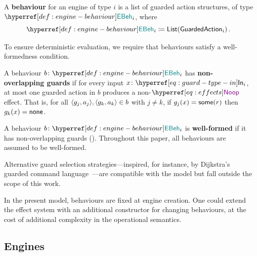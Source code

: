 \documentclass[
  a4paper,        %
  techreport,     %
]{art}
\begin{document}
\begin{definition}\label{def:engine-behaviour}%
A \textbf{behaviour} for an engine of type $i$ is a list of guarded action
structures, of type $\behaviourtype{i}$, where
\begin{equation}
\defequal{
  \behaviourtype{i}
}{
  \List{
    \mathsf{GuardedAction}_i
  }
}\,.
\end{equation}
\end{definition}

To ensure deterministic evaluation, we require that behaviours satisfy a
well-formedness condition.

\begin{definition}\label{def:non-overlapping-guards}%
A behaviour $\typing{b}{\behaviourtype{i}}$ has \textbf{non-overlapping guards}
if for every input $\typing{x}{\In{i}}$, at most one guarded action in $b$
produces a non-$\noop$ effect. That is, for all
$ \langle g_j , a_j \rangle ,  \langle g_k , a_k \rangle  \in b$ with $j \neq k$,
if $g_j(x) = \mathsf{some}(r)$ then $g_k(x) = \mathsf{none}$.
\end{definition}

\begin{definition}\label{def:well-formed-behaviour}%
A behaviour $\typing{b}{\behaviourtype{i}}$ is \textbf{well-formed} if it has
non-overlapping guards ().
Throughout this paper, all behaviours are assumed to be well-formed.
\end{definition}

Alternative guard selection strategies---inspired, for instance, by
Dijkstra's guarded command
language~\cite{dijkstra-guarded-commands}---are compatible with the model
but fall outside the scope of this work.

\begin{remark}\label{rem:fixed-behaviour}%
In the present model, behaviours are fixed at engine creation.
One could extend the effect system with an additional constructor
for changing behaviours, at the cost of additional complexity in the
operational semantics.
\end{remark}

\subsection{Engines}\label{sec:processing-engines}
\end{document}
